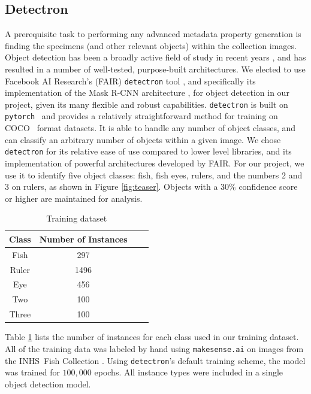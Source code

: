 \documentclass[conference]{IEEEtran}
\begin{document}
\subsection{Detectron}
A prerequisite task to performing any advanced metadata property generation
is finding the specimens (and other relevant objects) within the collection
images. Object detection has been a broadly active field of study in recent
years \cite{zou2019object}, and has resulted in a number of well-tested, purpose-built architectures. We elected to use Facebook AI Research's (FAIR)
\verb|detectron| tool \cite{wu2019detectron2}, and specifically its implementation of the Mask R-CNN architecture \cite{he2018mask}, for object detection in our project, given its many flexible and robust capabilities.
\verb|detectron| is built on \verb|pytorch|~\cite{NEURIPS2019_9015} and provides a relatively straightforward method for training on COCO~\cite{DBLP:journals/corr/LinMBHPRDZ14} format datasets. It is able to handle any number of object classes, and can classify an arbitrary number of objects within a given image. We chose \verb|detectron| for its relative ease of use compared to lower level libraries, and its implementation of powerful architectures developed by FAIR.
For our project, we use it to identify five object classes: fish, fish eyes, rulers, and the numbers 2 and 3 on rulers,
as shown in Figure \ref{fig:teaser}. Objects with a 30\% confidence score or higher are maintained for analysis.


\begin{table}[H]
    \centering
      \caption{Training dataset}
    \label{tab:dataset}
    \begin{tabular}{cccc}
        \toprule
        \textbf{Class} & \textbf{Number of Instances}\\
        \midrule
        Fish & 297\\
        Ruler & 1496\\
        Eye & 456\\
        Two & 100\\
        Three & 100\\
      \bottomrule
    \end{tabular}
\end{table}

Table \ref{tab:dataset} lists the number of instances for each class 
used in our training dataset.
All of the training data was labeled by hand using \verb|makesense.ai| \cite{make-sense}
on images from the INHS\ Fish Collection \cite{INHS}.
Using \verb|detectron|'s default training scheme, the model was trained for \(100,000\) epochs. All instance types were included in a single object detection model.
\end{document}
